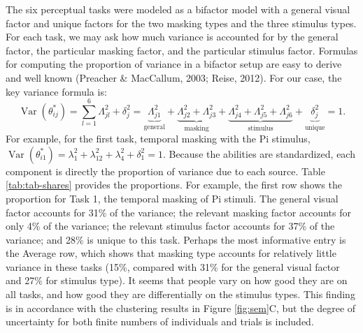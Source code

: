 \documentclass[
  ,man]{apa6}
\begin{document}
The six perceptual tasks were modeled as a bifactor model with a general visual factor and unique factors for the two masking types and the three stimulus types. For each task, we may ask how much variance is accounted for by the general factor, the particular masking factor, and the particular stimulus factor. Formulas for computing the proportion of variance in a bifactor setup are easy to derive and well known (Preacher \& MacCallum, 2003; Reise, 2012). For our case, the key variance formula is:
\[\operatorname{Var}(\theta^*_{ij}) = \sum_{l=1}^{6} \Lambda_{jl}^2 + \delta_j^2
= \underbrace{\Lambda_{j1}^2}_{\text{general}}
+ \underbrace{\Lambda_{j2}^2 + \Lambda_{j3}^2}_{\text{masking}}
+ \underbrace{\Lambda_{j4}^2 + \Lambda_{j5}^2 + \Lambda_{j6}^2}_{\text{stimulus}}
+ \underbrace{\delta_j^2}_{\text{unique}} = 1 .\]
For example, for the first task, temporal masking with the Pi stimulus, \(\operatorname{Var}(\theta^*_{i1}) = \lambda_{1}^2 + \lambda_{12}^2 + \lambda_{4}^2 + \delta_1^2 = 1\). Because the abilities are standardized, each component is directly the proportion of variance due to each source. Table \ref{tab:tab-shares} provides the proportions. For example, the first row shows the proportion for Task 1, the temporal masking of Pi stimuli. The general visual factor accounts for 31\% of the variance; the relevant masking factor accounts for only 4\% of the variance; the relevant stimulus factor accounts for 37\% of the variance; and 28\% is unique to this task. Perhaps the most informative entry is the Average row, which shows that masking type accounts for relatively little variance in these tasks (15\%, compared with 31\% for the general visual factor and 27\% for stimulus type). It seems that people vary on how good they are on all tasks, and how good they are differentially on the stimulus types. This finding is in accordance with the clustering results in Figure \ref{fig:sem}C, but the degree of uncertainty for both finite numbers of individuals and trials is included.
\end{document}
